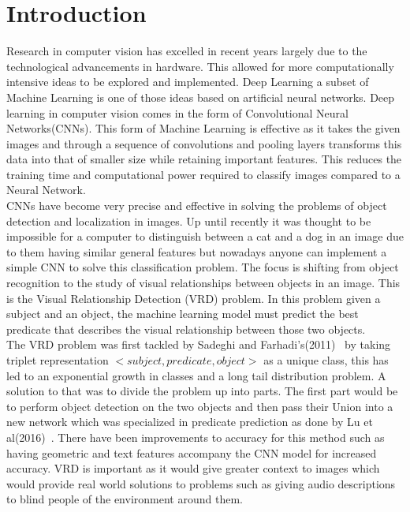 \documentclass{csfyp}
\newcommand\tab[1][1cm]{\hspace*{#1}}
\begin{document}
\section{Introduction}
\label{s:intro}
\tab
Research in computer vision has excelled in recent years largely due to the technological advancements in hardware. This allowed for more computationally intensive ideas to be explored and implemented. Deep Learning a subset of Machine Learning is one of those ideas based on artificial neural networks. Deep learning in computer vision comes in the form of Convolutional Neural Networks(CNNs). This form of Machine Learning is effective as it takes the given images and through a sequence of convolutions and pooling layers transforms this data into that of smaller size while retaining important features. This reduces the training time and computational power required to classify images compared to a Neural Network.
\\
\tab
CNNs have become very precise and effective in solving the problems of object detection and localization in images. Up until recently it was thought to be impossible for a computer to distinguish between a cat and a dog in an image due to them having similar general features but nowadays anyone can implement a simple CNN to solve this classification problem. The focus is shifting from object recognition to the study of visual relationships between objects in an image. This is the Visual Relationship Detection (VRD) problem. In this problem given a subject and an object, the machine learning model must predict the best \Gls{predicate} that describes the visual relationship between those two objects.
\\
\tab
The VRD problem was first tackled by Sadeghi and Farhadi’s(2011)~\cite{VisualPhrases} by taking triplet representation $< subject, predicate, object >$ as a unique class, this has led to an exponential growth in classes and a long tail distribution problem. A solution to that was to divide the problem up into parts. The first part would be to perform object detection on the two objects and then pass their Union into a new network which was specialized in \Gls{predicate} prediction as done by Lu et al(2016)~\cite{lu2016visual}.
There have been improvements to accuracy for this method such as having geometric and text features accompany the CNN model for increased accuracy. VRD is important as it would give greater context to images which would provide real world solutions to problems such as giving audio descriptions to blind people of the environment around them.
\end{document}
